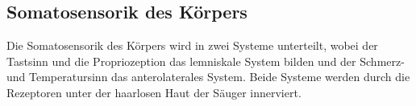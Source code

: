 \documentclass[12pt,a4paper,pdftex]{article}
\begin{document}

\subsection{Somatosensorik  des Körpers}
Die Somatosensorik des Körpers wird in zwei Systeme unterteilt, wobei der Tastsinn  und die Propriozeption das lemniskale System  bilden und der Schmerz- und Temperatursinn  das anterolaterales System.  Beide Systeme werden durch die Rezeptoren unter der haarlosen Haut der Säuger innerviert.
\end{document}
